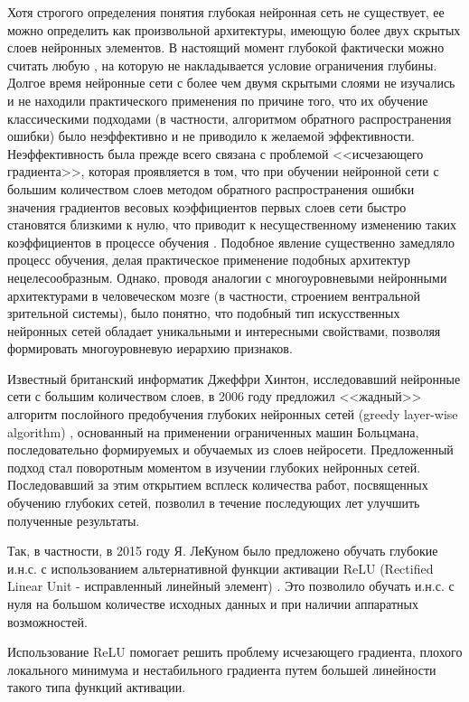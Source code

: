 Хотя строгого определения понятия глубокая нейронная сеть не существует, ее можно определить как  произвольной архитектуры, имеющую более двух скрытых слоев нейронных элементов. В настоящий момент глубокой фактически можно считать любую , на которую не накладывается условие ограничения глубины. Долгое время нейронные сети с более чем двумя скрытыми слоями не изучались и не находили практического применения по причине того, что их обучение классическими подходами (в частности, алгоритмом обратного распространения ошибки) было неэффективно и не приводило к желаемой эффективности. Неэффективность была прежде всего связана с проблемой <<исчезающего градиента>>, которая проявляется в том, что при обучении нейронной сети с большим количеством слоев методом обратного распространения ошибки значения градиентов весовых коэффициентов первых слоев сети быстро становятся близкими к нулю, что приводит к несущественному изменению таких коэффициентов в процессе обучения \cite{n5}. Подобное явление существенно замедляло процесс обучения, делая практическое применение подобных архитектур нецелесообразным. Однако, проводя аналогии с многоуровневыми нейронными архитектурами в человеческом мозге (в частности, строением вентральной зрительной системы), было понятно, что подобный тип искусственных нейронных сетей обладает  уникальными и интересными свойствами, позволяя формировать многоуровневую иерархию признаков.

Известный британский информатик Джеффри Хинтон, исследовавший нейронные сети с большим количеством слоев, в 2006 году предложил <<жадный>> алгоритм послойного предобучения глубоких нейронных сетей (greedy layer-wise algorithm) , основанный на применении ограниченных машин Больцмана, последовательно формируемых и обучаемых из слоев нейросети. Предложенный подход стал поворотным моментом в изучении глубоких нейронных сетей. Последовавший за этим открытием всплеск количества работ, посвященных обучению глубоких сетей, позволил в течение последующих лет улучшить полученные результаты. 

Так, в частности, в 2015 году Я. ЛеКуном было предложено обучать глубокие и.н.с. с использованием альтернативной функции активации ReLU (Rectified Linear Unit - исправленный линейный элемент) .  Это позволило обучать и.н.с. с нуля на большом количестве исходных данных и при наличии аппаратных возможностей.

Использование ReLU помогает решить проблему исчезающего градиента, плохого локального минимума и нестабильного градиента путем большей линейности такого типа функций активации.

